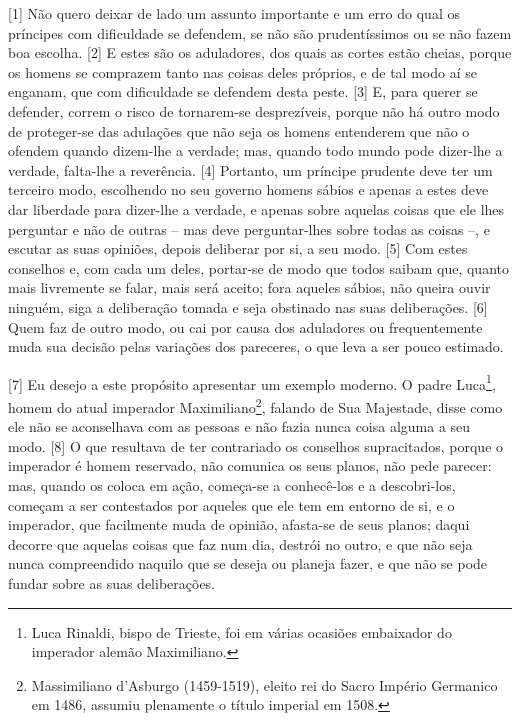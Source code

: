 {[}1{]} Não quero deixar de lado um assunto importante e um erro do qual
os príncipes com dificuldade se defendem, se não são prudentíssimos ou
se não fazem boa escolha. {[}2{]} E estes são os aduladores, dos quais
as cortes estão cheias, porque os homens se comprazem tanto nas coisas
deles próprios, e de tal modo aí se enganam, que com dificuldade se
defendem desta peste. {[}3{]} E, para querer se defender, correm o risco
de tornarem-se desprezíveis, porque não há outro modo de proteger-se das
adulações que não seja os homens entenderem que não o ofendem quando
dizem-lhe a verdade; mas, quando todo mundo pode dizer-lhe a verdade,
falta-lhe a reverência. {[}4{]} Portanto, um príncipe prudente deve ter
um terceiro modo, escolhendo no seu governo homens sábios e apenas a
estes deve dar liberdade para dizer-lhe a verdade, e apenas sobre
aquelas coisas que ele lhes perguntar e não de outras -- mas deve
perguntar-lhes sobre todas as coisas --, e escutar as suas opiniões,
depois deliberar por si, a seu modo. {[}5{]} Com estes conselhos e, com
cada um deles, portar-se de modo que todos saibam que, quanto mais
livremente se falar, mais será aceito; fora aqueles sábios, não queira
ouvir ninguém, siga a deliberação tomada e seja obstinado nas suas
deliberações. {[}6{]} Quem faz de outro modo, ou cai por causa dos
aduladores ou frequentemente muda sua decisão pelas variações dos
pareceres, o que leva a ser pouco estimado.

{[}7{]} Eu desejo a este propósito apresentar um exemplo moderno. O
padre Luca\footnote{Luca Rinaldi, bispo de Trieste, foi em várias
  ocasiões embaixador do imperador alemão Maximiliano.}, homem do atual
imperador Maximiliano\footnote{Massimiliano d'Asburgo (1459-1519),
  eleito rei do Sacro Império Germanico em 1486, assumiu plenamente o
  título imperial em 1508.}, falando de Sua Majestade, disse como ele
não se aconselhava com as pessoas e não fazia nunca coisa alguma a seu
modo. {[}8{]} O que resultava de ter contrariado os conselhos
supracitados, porque o imperador é homem reservado, não comunica os seus
planos, não pede parecer: mas, quando os coloca em ação, começa-se a
conhecê-los e a descobri-los, começam a ser contestados por aqueles que
ele tem em entorno de si, e o imperador, que facilmente muda de opinião,
afasta-se de seus planos; daqui decorre que aquelas coisas que faz num
dia, destrói no outro, e que não seja nunca compreendido naquilo que se
deseja ou planeja fazer, e que não se pode fundar sobre as suas
deliberações.


